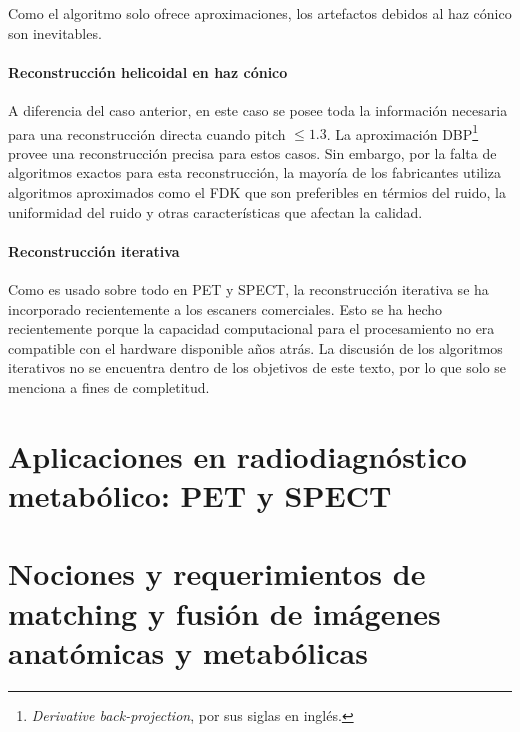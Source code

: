 Como el algoritmo solo ofrece aproximaciones, los artefactos debidos al haz
c{\'o}nico son inevitables.

\paragraph{Reconstrucci{\'o}n helicoidal en haz c{\'o}nico}

A diferencia del caso anterior, en este caso se posee toda la informaci{\'o}n
necesaria para una reconstrucci{\'o}n directa cuando pitch $\leq 1.3$. La
aproximaci{\'o}n DBP\footnote{{\emph{Derivative back-projection}}, por sus
siglas en ingl{\'e}s.} provee una reconstrucci{\'o}n precisa para estos casos.
Sin embargo, por la falta de algoritmos exactos para esta reconstrucci{\'o}n,
la mayor{\'i}a de los fabricantes utiliza algoritmos aproximados como el FDK
que son preferibles en t{\'e}rmios del ruido, la uniformidad del ruido y otras
caracter{\'i}sticas que afectan la calidad.

\paragraph{Reconstrucci{\'o}n iterativa}

Como es usado sobre todo en PET y SPECT, la reconstrucci{\'o}n iterativa se ha
incorporado recientemente a los escaners comerciales. Esto se ha hecho
recientemente porque la capacidad computacional para el procesamiento no era
compatible con el hardware disponible a{\~n}os atr{\'a}s. La discusi{\'o}n de
los algoritmos iterativos no se encuentra dentro de los objetivos de este
texto, por lo que solo se menciona a fines de completitud.



\section{Aplicaciones en radiodiagn\'ostico metab\'olico: PET y SPECT}

\section{Nociones y requerimientos de matching y fusi\'on de im\'agenes anat\'omicas y metab\'olicas}